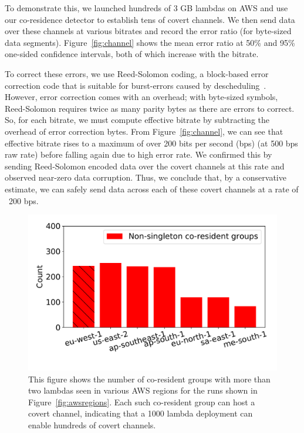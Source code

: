 To demonstrate this, we launched hundreds of 3 GB lambdas on AWS and use our
co-residence detector to establish tens of covert channels. We then send data
over these channels at various bitrates and record the error ratio (for
byte-sized data segments). Figure~\ref{fig:channel} shows the mean error ratio
at 50\% and 95\% one-sided confidence intervals, both of which increase with the bitrate.

To correct these errors, we use Reed-Solomon coding, a block-based error correction 
code that is suitable for burst-errors caused by descheduling~\cite{wuusenix2012}. 
However, error correction comes with an overhead; with byte-sized symbols,
Reed-Solomon requires twice as many parity bytes as there are errors to correct. 
So, for each bitrate, we must compute
effective bitrate by subtracting the overhead of error correction bytes.
From Figure~\ref{fig:channel}, we can see that effective bitrate rises to a
maximum of over 200 bits per second (bps) (at 500 bps raw rate) before falling
again due to high error rate. We confirmed this by sending Reed-Solomon encoded
data over the covert channels at this rate and observed near-zero data
corruption. Thus, we conclude that, by a conservative estimate, we can safely
send data across each of these covert channels at a rate of ~200 bps.


\begin{figure}[!t]
  \includegraphics[width=.99\linewidth]{fig/clusters.pdf}
  \caption{This figure shows the number of co-resident groups with more than two lambdas
  seen in various AWS regions for the runs shown in Figure~\ref{fig:awsregions}. 
  Each such co-resident group can host a covert channel, indicating that a 1000 lambda 
  deployment can enable hundreds of covert channels.
\label{fig:clusters}}
\end{figure}


